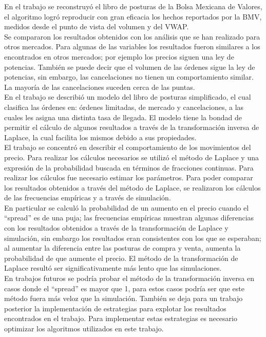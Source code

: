 \documentclass[11pt]{article}
\numberwithin{equation}{section} %
\begin{document}
En el trabajo se reconstruyó el libro de posturas de la Bolsa Mexicana de Valores, el algoritmo logró reproducir con gran eficacia los hechos reportados por la BMV, medidos desde el punto de vista del volumen y del VWAP.\\

Se compararon los resultados obtenidos con los análisis que se han realizado para otros mercados. Para algunas de las variables los resultados fueron similares a los encontrados en otros mercados; por ejemplo los precios siguen una ley de potencias. También se puede decir que el volumen de las órdenes sigue la ley de potencias, sin embargo, las cancelaciones no tienen un comportamiento similar. La mayoría de las cancelaciones suceden cerca de las puntas.\\

En el trabajo se describió un modelo del libro de posturas simplificado, el cual clasifica las órdenes en: órdenes limitadas, de mercado y cancelaciones, a las cuales les asigna una distinta tasa de llegada. El modelo tiene la bondad de permitir el cálculo de algunos resultados a través de la transformación inversa de Laplace, la cual facilita los mismos debido a sus propiedades.\\

El trabajo se concentró en describir el comportamiento de los movimientos del precio. Para realizar los cálculos necesarios se utilizó el método de Laplace y una expresión de la probabilidad buscada en términos de fracciones continuas. Para realizar los cálculos fue necesario estimar los parámetros. Para poder comparar los resultados obtenidos a través del método de Laplace, se realizaron los cálculos de las frecuencias empíricas y a través de simulación.\\

En particular se calculó la probabilidad de un aumento en el precio cuando el ``spread'' es de una puja; las frecuencias empíricas muestran algunas diferencias con los resultados obtenidos a través de la transformación de Laplace y simulación, sin embargo los resultados eran consistentes con los que se esperaban; al aumentar la diferencia entre las posturas de compra y venta, aumenta la probabilidad de que aumente el precio. El método de la transformación de Laplace resultó ser significativamente más lento que las simulaciones.\\

En trabajos futuros se podría probar el método de la transformación inversa en casos donde el ``spread'' es mayor que 1, para estos casos podría ser que este método fuera más veloz que la simulación. También se deja para un trabajo posterior la implementación de estrategias para explotar los resultados encontrados en el trabajo. Para implementar estas estrategias es necesario optimizar los algoritmos utilizados en este trabajo.\\
\end{document}
